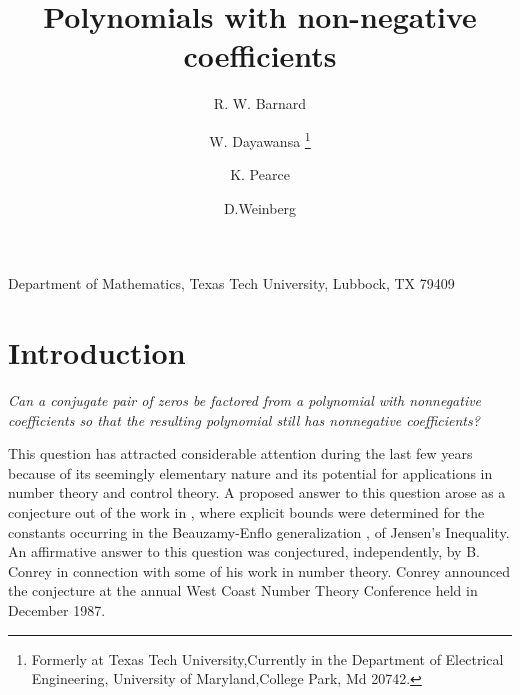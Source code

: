 \def\negate#1{\mbox{$\;$\begin{picture}(10,12)
\put(0,-2){\line(1,1){10}}
\put(6,0){\makebox(0,0)[b]{#1}}
\end{picture}$\;$}}

\newtheorem{example}{Example}[section]
\newtheorem{corollary}{Corollary}[section]
\newtheorem{lemma}{Lemma}[section]
\newtheorem{theorem}{Theorem}[section]
\newtheorem{proposition}{Proposition}[section]
\newtheorem{definition}{Definition}[section]
\newtheorem{notations}{Notations}[section]
\newtheorem{assumption}{Assumption}[section]
\newtheorem{remark}{Remark}
\newtheorem{problem}{Problem}[section]


\title{Polynomials with non-negative coefficients}

\author{R. W. Barnard \and W. Dayawansa \thanks{Formerly at Texas Tech
 University,\newline Currently in the Department of Electrical Engineering, University of Maryland,College Park, Md 20742.} \and K. Pearce \and D.Weinberg}
\date{}
\maketitle
\begin{center}{Department of Mathematics, Texas Tech University,
Lubbock, TX 79409}\end{center}

\section{Introduction}
{\em Can a conjugate pair of zeros be factored from a polynomial
with nonnegative coefficients so that the resulting polynomial still
has nonnegative coefficients?}

This question has attracted considerable attention during the last
few years because of its seemingly elementary nature and its
potential for applications in number theory and control theory.  A
proposed answer to this question arose as a conjecture out of the
work in \cite{5}, where explicit bounds were determined for the
constants occurring in the Beauzamy-Enflo generalization \cite{1},
\cite{2} of Jensen's Inequality.  An affirmative answer to this
question was conjectured, independently, by B. Conrey in connection
with some of his work in number theory.  Conrey announced the
conjecture at the annual West Coast Number Theory Conference held in
December 1987.

